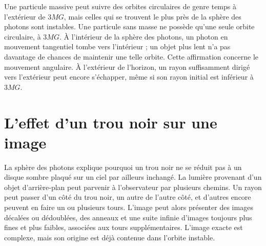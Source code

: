 \begin{classroomqa}
\end{classroomqa}

\begin{classroomqa}
\end{classroomqa}

Une particule massive peut suivre des orbites circulaires de genre temps à l’extérieur de \(3MG\), mais celles qui se trouvent le plus près de la sphère des photons sont instables. Une particule sans masse ne possède qu’une seule orbite circulaire, à \(3MG\). À l’intérieur de la sphère des photons, un photon en mouvement tangentiel tombe vers l’intérieur ; un objet plus lent n’a pas davantage de chances de maintenir une telle orbite. Cette affirmation concerne le mouvement angulaire. À l’extérieur de l’horizon, un rayon suffisamment dirigé vers l’extérieur peut encore s’échapper, même si son rayon initial est inférieur à \(3MG\).

\section{L’effet d’un trou noir sur une image}

La sphère des photons explique pourquoi un trou noir ne se réduit pas à un disque sombre plaqué sur un ciel par ailleurs inchangé. La lumière provenant d’un objet d’arrière-plan peut parvenir à l’observateur par plusieurs chemins. Un rayon peut passer d’un côté du trou noir, un autre de l’autre côté, et d’autres encore peuvent en faire un ou plusieurs tours. L’image peut alors présenter des images décalées ou dédoublées, des anneaux et une suite infinie d’images toujours plus fines et plus faibles, associées aux tours supplémentaires. L’image exacte est complexe, mais son origine est déjà contenue dans l’orbite instable.

